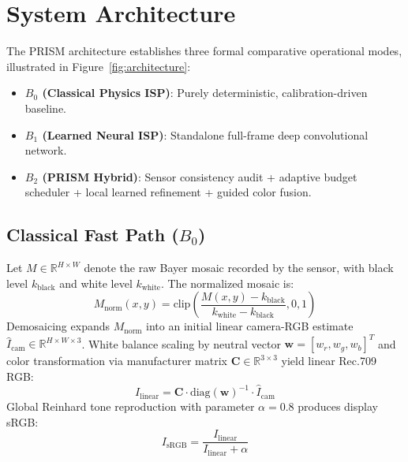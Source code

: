 \documentclass[10pt,twocolumn]{article}
\begin{document}
\section{System Architecture}

The PRISM architecture establishes three formal comparative operational modes, illustrated in Figure~\ref{fig:architecture}:
\begin{itemize}
    \item \textbf{$B_0$ (Classical Physics ISP)}: Purely deterministic, calibration-driven baseline.
    \item \textbf{$B_1$ (Learned Neural ISP)}: Standalone full-frame deep convolutional network.
    \item \textbf{$B_2$ (PRISM Hybrid)}: Sensor consistency audit + adaptive budget scheduler + local learned refinement + guided color fusion.
\end{itemize}

\subsection{Classical Fast Path ($B_0$)}
Let $M \in \mathbb{R}^{H \times W}$ denote the raw Bayer mosaic recorded by the sensor, with black level $k_{\text{black}}$ and white level $k_{\text{white}}$. The normalized mosaic is:
\begin{equation}
    M_{\text{norm}}(x, y) = \text{clip}\left(\frac{M(x, y) - k_{\text{black}}}{k_{\text{white}} - k_{\text{black}}}, 0, 1\right)
\end{equation}
Demosaicing expands $M_{\text{norm}}$ into an initial linear camera-RGB estimate $\hat{I}_{\text{cam}} \in \mathbb{R}^{H \times W \times 3}$. White balance scaling by neutral vector $\mathbf{w} = [w_r, w_g, w_b]^T$ and color transformation via manufacturer matrix $\mathbf{C} \in \mathbb{R}^{3 \times 3}$ yield linear Rec.709 RGB:
\begin{equation}
    I_{\text{linear}} = \mathbf{C} \cdot \text{diag}(\mathbf{w})^{-1} \cdot \hat{I}_{\text{cam}}
\end{equation}
Global Reinhard tone reproduction with parameter $\alpha = 0.8$ produces display sRGB:
\begin{equation}
    I_{\text{sRGB}} = \frac{I_{\text{linear}}}{I_{\text{linear}} + \alpha}
\end{equation}
\end{document}

